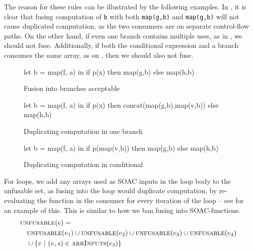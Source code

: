 \begin{description}[style=nextline]
The reason for these rules can be illustrated by the following
examples.  In , it is clear that fusing
computation of \texttt{b} with both \texttt{map(g,b)} and
\texttt{map(g,b)} will not cause duplicated computation, as the two
consumers are on separate control-flow paths.  On the other hand, if
even one branch contains multiple uses, as in
, we should not fuse.  Additionally, if
both the conditional expression and a branch consumes the same array,
as on , then we should also not
fuse.

\begin{figure}
\begin{center}
\begin{bcolorcode}
let b = map(f, a) in
if p(x) then map(g,b)
        else map(h,b)
\end{bcolorcode}
\end{center}
\caption{Fusion into branches acceptable}
\label{fig:fuse-across-if-ok}
\end{figure}

\begin{figure}
\begin{center}
\begin{bcolorcode}
let b = map(f, a) in
if p(x) then concat(map(g,b),map(v,b))
        else map(h,b)
\end{bcolorcode}
\end{center}
\caption{Duplicating computation in one branch}
\label{fig:fuse-across-if-bad}
\end{figure}

\begin{figure}
\begin{center}
\begin{bcolorcode}
let b = map(f, a) in
if p(map(v,b)) then map(g,b)
               else map(h,b)
\end{bcolorcode}
\end{center}
\caption{Duplicating computation in conditional}
\label{fig:fuse-across-if-bad-condition}
\end{figure}

\item[Case $e \equiv \texttt{loop ($p$ = $e_{1}$) = for $v$ < $e_{2}$ do $e_{3}$ in $e_{4}$}$]

  For loops, we add any arrays used as SOAC inputs in the loop body to
  the unfusable set, as fusing into the loop would duplicate
  computation, by re-evaluating the function in the consumer for every
  iteration of the loop -- see  for an
  example of this.  This is similar to how we ban fusing into
  SOAC-functions.
\begin{align*}
  & \textsc{unfusable}(e) =\\
  & \quad \textsc{unfusable}(e_{1}) \cup \textsc{unfusable}(e_{2}) \cup \textsc{unfusable}(e_{3}) \cup \textsc{unfusable}(e_{4}) \\
  & \quad \cup \{ v\ |\ (v,s) \in \textsc{arrInputs}(e_{3}) \}
\end{align*}


\end{description}
